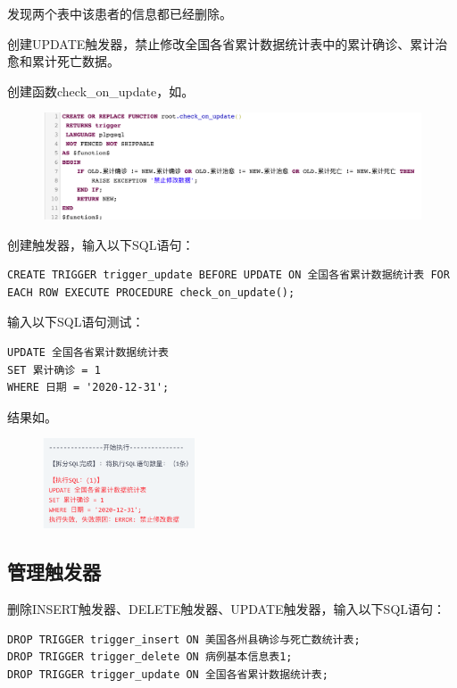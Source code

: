 \documentclass[lang=cn,11pt,a4paper,cite=authornum]{paper}
\begin{document}
发现两个表中该患者的信息都已经删除。

创建UPDATE触发器，禁止修改全国各省累计数据统计表中的累计确诊、累计治愈和累计死亡数据。

创建函数check\_on\_update，如。
\begin{figure}[!htb]
    \centering
    \includegraphics[width=\textwidth]{./images/res41.png}
    \caption{\label{fig:res41}}
\end{figure}

创建触发器，输入以下SQL语句：
\begin{code}
\begin{verbatim}
CREATE TRIGGER trigger_update BEFORE UPDATE ON 全国各省累计数据统计表 FOR EACH ROW EXECUTE PROCEDURE check_on_update();
\end{verbatim}
\end{code}

输入以下SQL语句测试：
\begin{code}
\begin{verbatim}
UPDATE 全国各省累计数据统计表 
SET 累计确诊 = 1
WHERE 日期 = '2020-12-31';
\end{verbatim}
\end{code}

结果如。
\begin{figure}[!htb]
    \centering
    \includegraphics[width=0.4\textwidth]{./images/res42.png}
    \caption{\label{fig:res42}}
\end{figure}

\subsection{管理触发器}

删除INSERT触发器、DELETE触发器、UPDATE触发器，输入以下SQL语句：
\begin{code}
\begin{verbatim}
DROP TRIGGER trigger_insert ON 美国各州县确诊与死亡数统计表;
DROP TRIGGER trigger_delete ON 病例基本信息表1;
DROP TRIGGER trigger_update ON 全国各省累计数据统计表;
\end{verbatim}
\end{code}
\end{document}
